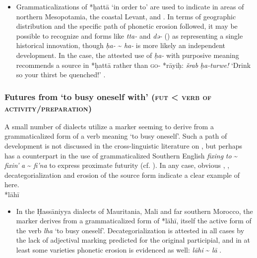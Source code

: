 \documentclass[output=paper]{langsci/langscibook}
\begin{document}
\begin{itemize}

  \item[]
Grammaticalizations of *ḥattā ‘in order to’ are used to indicate   in areas of northern Mesopotamia, the coastal Levant, and . In terms of geographic distribution and the specific path of phonetic erosion followed, it may be possible to recognize  and  forms like  \textit{tta-} and  \textit{də-} (\citealt{Borg1985,Jastrow1979}) as representing a single historical innovation, though  \textit{ḥa-} {\textasciitilde} \textit{ha-} is more likely an independent development. In the  case, the attested use of \textit{ḥa-} with purposive meaning recommends a source in *ḥattā rather than \textsc{go}{}- *rāyiḥ: \textit{šrab} \textit{ḥa-turwe!} ‘Drink so your thirst be quenched!’ \citep[276]{Reinhardt1894}.
\end{itemize}

\subsubsection{ Futures from ‘to busy oneself with’ (\textsc{fut} < \textsc{verb} \textsc{of} \textsc{activity/preparation})}

A small number of  dialects utilize a   marker seeming to derive from a grammaticalized form of a verb meaning ‘to busy oneself’. Such a path of development is not discussed in the cross-linguistic literature on , but perhaps has a counterpart in the use of grammaticalized {Southern}  {English} \textit{fixing} \textit{to} {\textasciitilde} \textit{fixin’} \textit{a} {\textasciitilde} \textit{fi’na} to express proximate futurity (cf. \citealt{Wolfram1998}). In any case, obvious , , decategorialization and erosion of the source form indicate a clear example of  here.\\
 
*lāhī

\begin{itemize}

  \item[]
In the Ḥassāniyya dialects of Mauritania, Mali and far southern Morocco, the   marker derives from a grammaticalized form of *lāhī, itself the active  form of the verb \textit{lha} ‘to busy oneself’. Decategorialization is attested in all cases by the lack of adjectival  marking predicted for the original participial, and in at least some varieties phonetic erosion is evidenced as well:  \textit{lāhi} {\textasciitilde} \textit{lā} \citep{Heath2003}.
\end{itemize}
\end{document}
